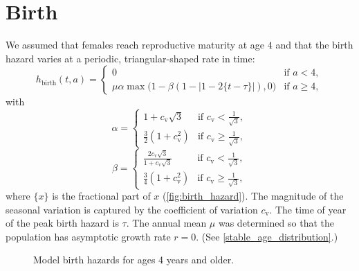\documentclass[12pt]{article}
\begin{document}
\section{Birth}

We assumed that females reach reproductive maturity at age $4$ and
that the birth hazard varies at a periodic, triangular-shaped rate in
time:
\begin{equation}
  h_{\text{birth}}(t, a) =
  \begin{cases}
    0 & \text{if $a < 4$},
    \\
    \mu \alpha \max\big(1 - \beta (1 - |1 - 2 \{t - \tau\}|), 0\big)
    & \text{if $a \geq 4$},
  \end{cases}
\end{equation}
with
\begin{equation}
  \alpha =
  \begin{cases}
    1 + c_{\text{v}} \sqrt{3}
    & \text{if $c_{\text{v}} < \frac{1}{\sqrt{3}}$},
    \\
    \frac{3}{2} \left(1 + c_{\text{v}}^2\right)
    & \text{if $c_{\text{v}} \geq \frac{1}{\sqrt{3}}$},
  \end{cases}
\end{equation}
\begin{equation}
  \beta =
  \begin{cases}
    \frac{2 c_{\text{v}} \sqrt{3}}{1 + c_{\text{v}} \sqrt{3}}
    & \text{if $c_{\text{v}} < \frac{1}{\sqrt{3}}$},
    \\
    \frac{3}{4} \left(1 + c_{\text{v}}^2\right)
    & \text{if $c_{\text{v}} \geq \frac{1}{\sqrt{3}}$},
  \end{cases}
\end{equation}
where $\{x\}$ is the fractional part of $x$
(\autoref{fig:birth_hazard}).  The magnitude of the seasonal variation
is captured by the coefficient of variation $c_{\text{v}}$.  The time of year
of the peak birth hazard is $\tau$.  The annual mean $\mu$ was determined
so that the population has asymptotic growth rate $r = 0$.  (See
\autoref{stable_age_distribution}.)

\begin{figure}
  \centering
  \begin{sansmath}
    
  \end{sansmath}
  \caption{Model birth hazards for ages 4 years and older.}
  \label{fig:birth_hazard}
\end{figure}
\end{document}
